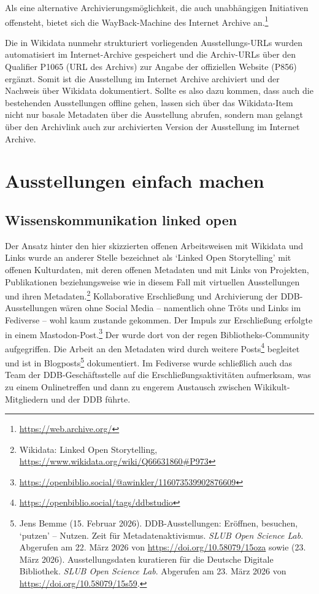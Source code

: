 \documentclass[a4paper,
fontsize=11pt,
oneside,
numbers=noperiodatend,
parskip=half-,
bibliography=totoc,
final
]{scrartcl}
\begin{document}
Als eine alternative Archivierungsmöglichkeit, die auch unabhängigen
Initiativen offensteht, bietet sich die WayBack-Machine des Internet
Archive an.\footnote{\url{https://web.archive.org/}}

Die in Wikidata nunmehr strukturiert vorliegenden Ausstellungs-URLs
wurden automatisiert im Internet-Archive gespeichert und die Archiv-URLs
über den Qualifier P1065 (URL des Archivs) zur Angabe der offiziellen
Website (P856) ergänzt. Somit ist die Ausstellung im Internet Archive
archiviert und der Nachweis über Wikidata dokumentiert. Sollte es also
dazu kommen, dass auch die bestehenden Ausstellungen offline gehen,
lassen sich über das Wikidata-Item nicht nur basale Metadaten über die
Ausstellung abrufen, sondern man gelangt über den Archivlink auch zur
archivierten Version der Ausstellung im Internet Archive.

\hypertarget{ausstellungen-einfach-machen}{%
\section{Ausstellungen einfach
machen}\label{ausstellungen-einfach-machen}}

\hypertarget{wissenskommunikation-linked-open}{%
\subsection{Wissenskommunikation linked
open}\label{wissenskommunikation-linked-open}}

Der Ansatz hinter den hier skizzierten offenen Arbeitsweisen mit
Wikidata und Links wurde an anderer Stelle bezeichnet als
\enquote*{Linked Open Storytelling} mit offenen Kulturdaten, mit deren
offenen Metadaten und mit Links von Projekten, Publikationen
beziehungsweise wie in diesem Fall mit virtuellen Ausstellungen und
ihren Metadaten.\footnote{Wikidata: Linked Open Storytelling,
  \url{https://www.wikidata.org/wiki/Q66631860\#P973}} Kollaborative
Erschließung und Archivierung der DDB-Ausstellungen wären ohne Social
Media -- namentlich ohne Tröts und Links im Fediverse -- wohl kaum
zustande gekommen. Der Impuls zur Erschließung erfolgte in einem
Mastodon-Post.\footnote{\url{https://openbiblio.social/@awinkler/116073539902876609}}
Der wurde dort von der regen Bibliotheks-Community aufgegriffen. Die
Arbeit an den Metadaten wird durch weitere Posts\footnote{\url{https://openbiblio.social/tags/ddbstudio}}
begleitet und ist in Blogposts\footnote{Jens Bemme (15. Februar 2026).
  DDB-Ausstellungen: Eröffnen, besuchen, \enquote*{putzen} -- Nutzen.
  Zeit für Metadatenaktivismus. \emph{SLUB Open Science Lab}. Abgerufen
  am 22. März 2026 von \url{https://doi.org/10.58079/15oza} sowie (23.
  März 2026). Ausstellungsdaten kuratieren für die Deutsche Digitale
  Bibliothek. \emph{SLUB Open Science Lab}. Abgerufen am 23. März 2026
  von \url{https://doi.org/10.58079/15s59}.} dokumentiert. Im Fediverse
wurde schließlich auch das Team der DDB-Geschäftsstelle auf die
Erschließungsaktivitäten aufmerksam, was zu einem Onlinetreffen und dann
zu engerem Austausch zwischen Wikikult-Mitgliedern und der DDB führte.
\end{document}
